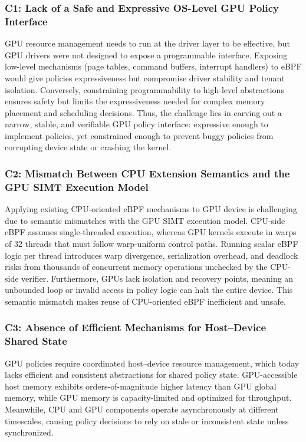 \subsubsection{C1: Lack of a Safe and Expressive OS-Level GPU Policy Interface}
GPU resource management needs to run at the driver layer to be effective, but GPU drivers were not designed to expose a programmable interface. Exposing low-level mechanisms (page tables, command buffers, interrupt handlers) to eBPF would give policies expressiveness but compromise driver stability and tenant isolation. Conversely, constraining programmability to high-level abstractions ensures safety but limits the expressiveness needed for complex memory placement and scheduling decisions. Thus, the challenge lies in carving out a narrow, stable, and verifiable GPU policy interface: expressive enough to implement policies, yet constrained enough to prevent buggy policies from corrupting device state or crashing the kernel.

\subsubsection{C2: Mismatch Between CPU Extension Semantics and the GPU SIMT Execution Model}
Applying existing CPU-oriented eBPF mechanisms to GPU device is challenging due to semantic mismatches with the GPU SIMT execution model. CPU-side eBPF assumes single-threaded execution, whereas GPU kernels execute in warps of 32 threads that must follow warp-uniform control paths. Running scalar eBPF logic per thread introduces warp divergence, serialization overhead, and deadlock risks from thousands of concurrent memory operations unchecked by the CPU-side verifier. Furthermore, GPUs lack isolation and recovery points, meaning an unbounded loop or invalid access in policy logic can halt the entire device. This semantic mismatch makes reuse of CPU-oriented eBPF inefficient and unsafe.

\subsubsection{C3: Absence of Efficient Mechanisms for Host–Device Shared State}
GPU policies require coordinated host–device resource management, which today lacks efficient and consistent abstractions for shared policy state. GPU-accessible host memory exhibits orders-of-magnitude higher latency than GPU global memory, while GPU memory is capacity-limited and optimized for throughput. Meanwhile, CPU and GPU components operate asynchronously at different timescales, causing policy decisions to rely on stale or inconsistent state unless synchronized.


